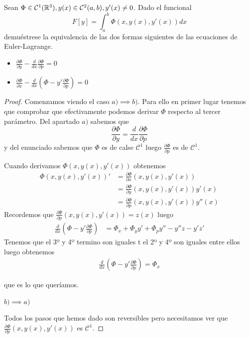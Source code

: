 \begin{ejercicio}
  Sean $\Phi\in \mathcal{C}^1(\mathbb{R}^3), y(x)\in \mathcal{C}^2(a,b), y'(x) \neq 0$. Dado el funcional
  \[
    F[y] = \int_{a}^{b}{\Phi(x,y(x),y'(x))dx}
  \]
  demuéstrese la equivalencia de las dos formas siguientes de las
  ecuaciones de Euler-Lagrange.
  \begin{itemize}
  \item $\frac{\partial\Phi}{\partial y}-\frac{d}{dx}\frac{\partial\Phi}{\partial p} = 0 $
  \item $\frac{\partial\Phi}{\partial x} - \frac{d}{dx}(\Phi-y'\frac{\partial\Phi}{\partial p}) = 0$
  \end{itemize}
  \begin{proof}
    Comenzamos viendo el caso $a) \implies b)$. Para ello en primer
    lugar tenemos que comprobar que efectivamente podemos derivar
    $\Phi$ respecto al tercer parámetro. Del apartado $a)$ sabemos que
    \[
      \frac{\partial\Phi}{\partial y} = \frac{d}{dx}\frac{\partial\Phi}{\partial p}
    \]
    y del enunciado sabemos que $\Phi$ es de calse $\mathcal{C}^1$
    luego $\frac{\partial\Phi}{\partial p}$ es de $\mathcal{C}^1$.

    Cuando derivamos $\Phi(x,y(x),y'(x))$ obtenemos
    \begin{align*}
      \Phi(x,y(x),y'(x))' & = \frac{\partial\Phi}{\partial x}(x, y(x), y'(x)) \\
                          & = \frac{\partial\Phi}{\partial y}(x, y(x), y'(x))y'(x) \\
                          & = \frac{\partial\Phi}{\partial p}(x, y(x), y'(x))y''(x)
    \end{align*}
    Recordemos que $\frac{\partial\Phi}{\partial p}(x, y(x), y'(x)) = z(x)$ luego
    \begin{align*}
      \frac{d}{dx}(\Phi-y'\frac{\partial\Phi}{\partial p}) & = \Phi_x + \Phi_yy' + \Phi_py'' - y''z -y'z'
    \end{align*}
    Tenemos que el 3º y 4º termino son iguales t el 2º y 4º son
    iguales entre ellos luego obtenemos
        \begin{align*}
      \frac{d}{dx}(\Phi-y'\frac{\partial\Phi}{\partial p}) = \Phi_x
        \end{align*}

        que es lo que queríamos.

        $b)\implies a)$
        
        Todos los pasos que hemos dado son reversibles pero
        necesitamos ver que
        $\frac{\partial\Phi}{\partial p}(x, y(x), y'(x))$ es $\mathcal{C}^1$.


\end{proof}
\end{ejercicio}
